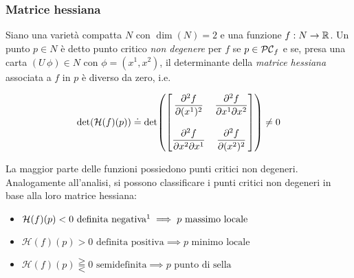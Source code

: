 \subsubsection{Matrice hessiana}

Siano una varietà compatta $ N $ con $ \dim(N) = 2 $ e una funzione $ f : N \to \mathbb{R} $. Un punto $ p \in N $  è detto punto critico \textit{non degenere} per $ f $ se $ p \in \mathcal{PC}_{f} $ e se, presa una carta $ (U\,\phi) \in N $ con $ \phi = (x^{1},x^{2}) $, il determinante della \textit{matrice hessiana} associata a $ f $ in $ p $ è diverso da zero, i.e.

\begin{equation}
	\det(\mathcal{H}(f)(p)) \doteq \det( \bmqty{ \dpdv[2]{f}{(x^{1})} & \dpdv[2]{f}{x^{1}}{x^{2}} \\\\ \dpdv[2]{f}{x^{2}}{x^{1}} & \dpdv[2]{f}{(x^{2})} } ) %
	\neq 0
\end{equation}

La maggior parte delle funzioni possiedono punti critici non degeneri.\\
Analogamente all'analisi, si possono classificare i punti critici non degeneri in base alla loro matrice hessiana:

\begin{itemize}
	\item $ \mathcal{H}(f)(p) < 0 \text{ definita negativa\footnotemark} \implies p \text{ massimo locale} $
	
	\item $ \mathcal{H}(f)(p) > 0 \text{ definita positiva} \implies p \text{ minimo locale} $
	
	\item $ \mathcal{H}(f)(p) \gtreqqless 0 \text{ semidefinita} \implies p \text{ punto di sella} $
\end{itemize}

